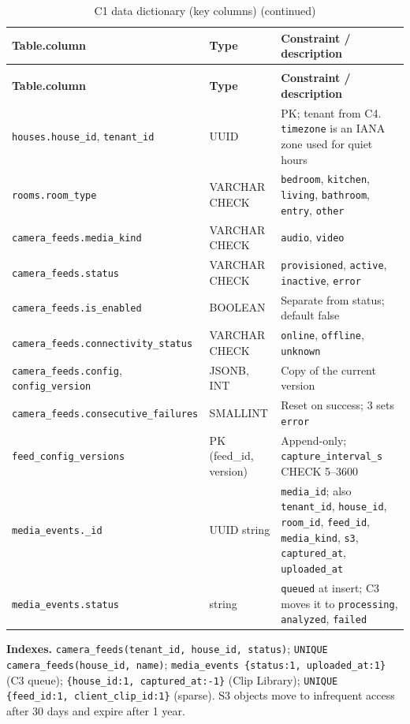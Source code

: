\begin{longtable}{L{4.6cm}L{3.0cm}L{7.0cm}}
\caption{C1 data dictionary (key columns)}\label{tab:c1-dd}\\
\toprule
\textbf{Table.column} & \textbf{Type} & \textbf{Constraint / description} \\
\midrule
\endfirsthead
\caption[]{C1 data dictionary (key columns) (continued)}\\
\toprule
\textbf{Table.column} & \textbf{Type} & \textbf{Constraint / description} \\
\midrule
\endhead
\texttt{houses.house\_id}, \texttt{tenant\_id} & UUID & PK; tenant from C4. \texttt{timezone} is an IANA zone used for quiet hours \\
\texttt{rooms.room\_type} & VARCHAR CHECK & \texttt{bedroom}, \texttt{kitchen}, \texttt{living}, \texttt{bathroom}, \texttt{entry}, \texttt{other} \\
\texttt{camera\_feeds.media\_kind} & VARCHAR CHECK & \texttt{audio}, \texttt{video} \\
\texttt{camera\_feeds.status} & VARCHAR CHECK & \texttt{provisioned}, \texttt{active}, \texttt{inactive}, \texttt{error} \\
\texttt{camera\_feeds.is\_enabled} & BOOLEAN & Separate from status; default false \\
\texttt{camera\_feeds.connectivity\_status} & VARCHAR CHECK & \texttt{online}, \texttt{offline}, \texttt{unknown} \\
\texttt{camera\_feeds.config}, \texttt{config\_version} & JSONB, INT & Copy of the current version \\
\texttt{camera\_feeds.consecutive\_failures} & SMALLINT & Reset on success; 3 sets \texttt{error} \\
\texttt{feed\_config\_versions} & PK (feed\_id, version) & Append-only; \texttt{capture\_interval\_s} CHECK 5--3600 \\
\texttt{media\_events.\_id} & UUID string & \texttt{media\_id}; also \texttt{tenant\_id}, \texttt{house\_id}, \texttt{room\_id}, \texttt{feed\_id}, \texttt{media\_kind}, \texttt{s3}, \texttt{captured\_at}, \texttt{uploaded\_at} \\
\texttt{media\_events.status} & string & \texttt{queued} at insert; C3 moves it to \texttt{processing}, \texttt{analyzed}, \texttt{failed} \\
\bottomrule
\end{longtable}
\textbf{Indexes.} \texttt{camera\_feeds(tenant\_id, house\_id, status)}; \texttt{UNIQUE camera\_feeds(house\_id, name)};
\texttt{media\_events \{status:1, uploaded\_at:1\}} (C3 queue); \texttt{\{house\_id:1, captured\_at:-1\}} (Clip Library);
\texttt{UNIQUE \{feed\_id:1, client\_clip\_id:1\}} (sparse). S3 objects move to infrequent access after 30 days and expire after 1 year.

